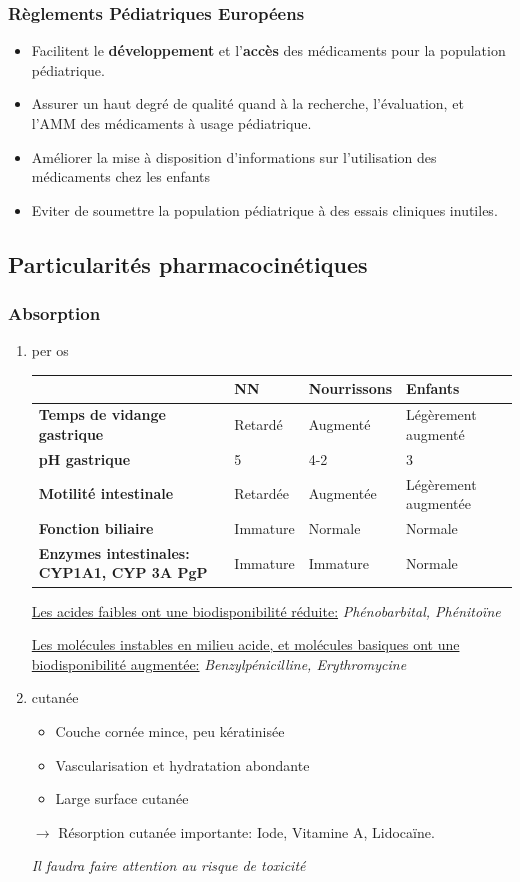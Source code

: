 \documentclass[11pt]{article}
\begin{document}
\subsubsection{Règlements Pédiatriques Européens}
\label{sec:org1de9488}
\begin{itemize}
\item Facilitent le \textbf{développement} et l'\textbf{accès} des médicaments pour la population pédiatrique.
\item Assurer un haut degré de qualité quand à la recherche, l'évaluation, et l'AMM des médicaments à usage pédiatrique.
\item Améliorer la mise à disposition d'informations sur l'utilisation des médicaments chez les enfants
\item Eviter de soumettre la population pédiatrique à des essais cliniques inutiles.
\end{itemize}
\subsection{Particularités pharmacocinétiques}
\label{sec:orgb40fe62}
\subsubsection{Absorption}
\label{sec:org36fceec}
\begin{enumerate}
\item per os
\label{sec:orgc8fccc7}
\begin{center}
\begin{center}
\begin{tabular}{llll}
 & NN & Nourrissons & Enfants\\
\hline
\textbf{Temps de vidange gastrique} & Retardé & Augmenté & Légèrement augmenté\\
\textbf{pH gastrique} & 5 & 4-2 & 3\\
\textbf{Motilité intestinale} & Retardée & Augmentée & Légèrement augmentée\\
\textbf{Fonction biliaire} & Immature & Normale & Normale\\
\textbf{Enzymes intestinales: CYP1A1, CYP 3A PgP} & Immature & Immature & Normale\\
\end{tabular}
\end{center}
\end{center}
\uline{Les acides faibles ont une biodisponibilité réduite:} \emph{Phénobarbital, Phénitoïne}

\uline{Les molécules instables en milieu acide, et molécules basiques  ont une biodisponibilité augmentée:} \emph{Benzylpénicilline, Erythromycine}
\item cutanée
\label{sec:org690e51a}
\begin{itemize}
\item Couche cornée mince, peu kératinisée
\item Vascularisation et hydratation abondante
\item Large surface cutanée
\end{itemize}
\(\to\) Résorption cutanée importante: Iode, Vitamine A, Lidocaïne.

\emph{Il faudra faire attention au risque de toxicité}
\end{enumerate}
\end{document}
